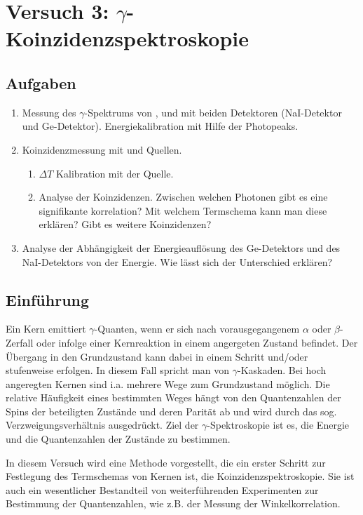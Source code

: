 \section{Versuch 3: $\gamma$-Koinzidenzspektroskopie}
\subsection{Aufgaben}
\begin{enumerate}
    \item Messung des $\gamma$-Spektrums von ,  und  mit beiden Detektoren (NaI-Detektor und Ge-Detektor). Energiekalibration mit Hilfe der Photopeaks.
    \item Koinzidenzmessung mit  und  Quellen.
    \begin{enumerate}
        \item $\Delta T$ Kalibration mit der  Quelle.
        \item Analyse der Koinzidenzen. Zwischen welchen Photonen gibt es eine signifikante korrelation? Mit welchem Termschema kann man diese erklären? Gibt es weitere Koinzidenzen?
    \end{enumerate}
    \item Analyse der Abhängigkeit der Energieauflösung des Ge-Detektors und des NaI-Detektors von der Energie. Wie lässt sich der Unterschied erklären?
\end{enumerate}



\subsection{Einführung}
Ein Kern emittiert $\gamma$-Quanten, wenn er sich nach vorausgegangenem $\alpha$ oder $\beta$-Zerfall oder infolge einer Kernreaktion in einem angergeten Zustand befindet. Der Übergang in den Grundzustand kann dabei in einem Schritt und/oder stufenweise erfolgen. In diesem Fall spricht man von $\gamma$-Kaskaden. Bei hoch angeregten Kernen sind i.a. mehrere Wege zum Grundzustand möglich. Die relative Häufigkeit eines bestimmten Weges hängt von den Quantenzahlen der Spins der beteiligten Zustände und deren Parität ab und wird durch das sog. Verzweigungsverhältnis ausgedrückt. Ziel der $\gamma$-Spektroskopie ist es, die Energie und die Quantenzahlen der Zustände zu bestimmen.

In diesem Versuch wird eine Methode vorgestellt, die ein erster Schritt zur Festlegung des Termschemas von Kernen ist, die Koinzidenzspektroskopie. Sie ist auch ein wesentlicher Bestandteil von weiterführenden Experimenten zur Bestimmung der Quantenzahlen, wie z.B. der Messung der Winkelkorrelation.

